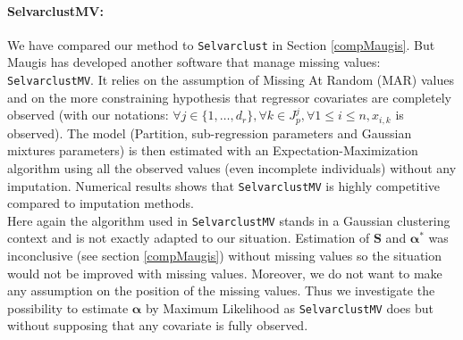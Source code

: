 \documentclass[12pt,a4paper]{report}
\begin{document}
	\paragraph{SelvarclustMV:} We have compared our method to {\tt Selvarclust} in Section \ref{compMaugis}. But Maugis  has developed another software \cite{maugis2012selvarclustmv} that manage missing values: {\tt SelvarclustMV}. It relies on the assumption of Missing At Random (MAR) values and on the more constraining hypothesis that regressor covariates are completely observed (with our notations: $\forall j \in \{1,\dots,d_r \}, \forall k \in J_p^j, \forall 1\leq i \leq n, x_{i,k}$ is observed). The model (Partition, sub-regression parameters and Gaussian mixtures parameters) is then estimated with an Expectation-Maximization algorithm using all the observed values (even incomplete individuals) without any imputation. Numerical results shows that {\tt SelvarclustMV} is highly competitive compared to imputation methods.\\
 Here again the algorithm used in {\tt SelvarclustMV} stands in a Gaussian clustering context and is not exactly adapted to our situation. Estimation of $\boldsymbol{S}$ and $\boldsymbol{\alpha}^*$ was inconclusive (see section \ref{compMaugis}) without missing values so the situation would not be improved with missing values.
 Moreover, we do not want to make any assumption on the position of the missing values. Thus we investigate the possibility to estimate $\boldsymbol{\alpha}$ by Maximum Likelihood as {\tt SelvarclustMV} does but without supposing that any covariate is fully observed.\\
	
\end{document}
